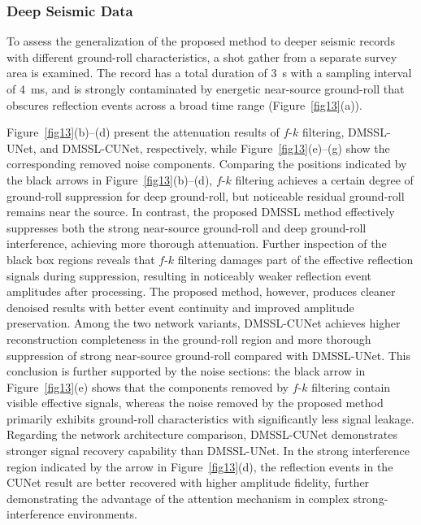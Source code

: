 \documentclass[alpha-refs]{wiley-article}
\begin{document}
\subsubsection{Deep Seismic Data}

To assess the generalization of the proposed method to deeper seismic records with 
different ground-roll characteristics, a shot gather from a separate survey area is 
examined. The record has a total duration of \SI{3}{\second} with a sampling interval of \SI{4}{\ms}, 
and is strongly contaminated by energetic near-source ground-roll that obscures reflection 
events across a broad time range (Figure~\ref{fig13}(a)).

Figure~\ref{fig13}(b)--(d) present the attenuation results of $f$-$k$ filtering, 
DMSSL-UNet, and DMSSL-CUNet, respectively, while Figure~\ref{fig13}(e)--(g) show 
the corresponding removed noise components. Comparing the positions indicated by the black 
arrows in Figure~\ref{fig13}(b)--(d), $f$-$k$ filtering achieves a certain degree of 
ground-roll suppression for deep ground-roll, but noticeable residual ground-roll remains 
near the source. In contrast, the proposed DMSSL method effectively suppresses both the 
strong near-source ground-roll and deep ground-roll interference, achieving more thorough 
attenuation. Further inspection of the black box regions reveals that $f$-$k$ filtering damages 
part of the effective reflection signals during suppression, resulting in noticeably weaker 
reflection event amplitudes after processing. The proposed method, however, produces cleaner 
denoised results with better event continuity and improved amplitude preservation. Among 
the two network variants, DMSSL-CUNet achieves higher reconstruction completeness in the 
ground-roll region and more thorough suppression of strong near-source ground-roll compared 
with DMSSL-UNet. This conclusion is further supported by the noise sections: the black 
arrow in Figure~\ref{fig13}(e) shows that the components removed by $f$-$k$ filtering contain 
visible effective signals, whereas the noise removed by the proposed method primarily 
exhibits ground-roll characteristics with significantly less signal leakage. Regarding the 
network architecture comparison, DMSSL-CUNet demonstrates stronger signal recovery 
capability than DMSSL-UNet. In the strong interference region indicated by the arrow in 
Figure~\ref{fig13}(d), the reflection events in the CUNet result are better recovered with 
higher amplitude fidelity, further demonstrating the advantage of the attention mechanism 
in complex strong-interference environments.
\end{document}
